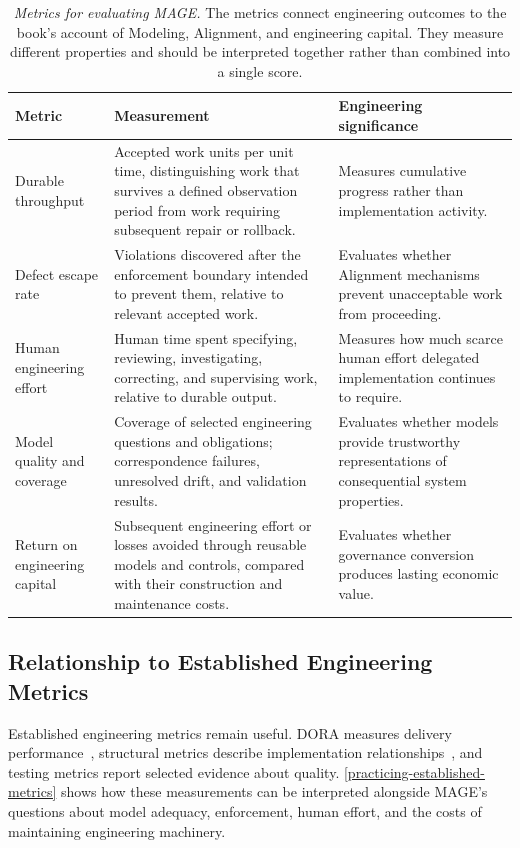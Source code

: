 {\footnotesize
\begin{longtable}[]{@{}p{.22\linewidth}p{.35\linewidth}p{.33\linewidth}@{}}
\caption[Metrics for evaluating MAGE]{\emph{Metrics for evaluating MAGE.} The metrics connect engineering outcomes to the book's account of Modeling, Alignment, and engineering capital. They measure different properties and should be interpreted together rather than combined into a single score.}\label{practicing-primary-readings}\\
\toprule
\textbf{Metric} & \textbf{Measurement} & \textbf{Engineering significance} \\
\midrule
\endhead
Durable throughput & Accepted work units per unit time, distinguishing work that survives a defined observation period from work requiring subsequent repair or rollback. & Measures cumulative progress rather than implementation activity. \\
Defect escape rate & Violations discovered after the enforcement boundary intended to prevent them, relative to relevant accepted work. & Evaluates whether Alignment mechanisms prevent unacceptable work from proceeding. \\
Human engineering effort & Human time spent specifying, reviewing, investigating, correcting, and supervising work, relative to durable output. & Measures how much scarce human effort delegated implementation continues to require. \\
Model quality and coverage & Coverage of selected engineering questions and obligations; correspondence failures, unresolved drift, and validation results. & Evaluates whether models provide trustworthy representations of consequential system properties. \\
Return on engineering capital & Subsequent engineering effort or losses avoided through reusable models and controls, compared with their construction and maintenance costs. & Evaluates whether governance conversion produces lasting economic value. \\
\bottomrule
\end{longtable}
}

\subsection{Relationship to Established Engineering Metrics}\label{heading:relationship-to-established-engineering-metrics}

Established engineering metrics remain useful. DORA measures delivery performance~\citep{dora-metrics}, structural metrics describe implementation relationships~\citep{chidamber1994metrics}, and testing metrics report selected evidence about quality. \autoref{practicing-established-metrics} shows how these measurements can be interpreted alongside MAGE's questions about model adequacy, enforcement, human effort, and the costs of maintaining engineering machinery.

